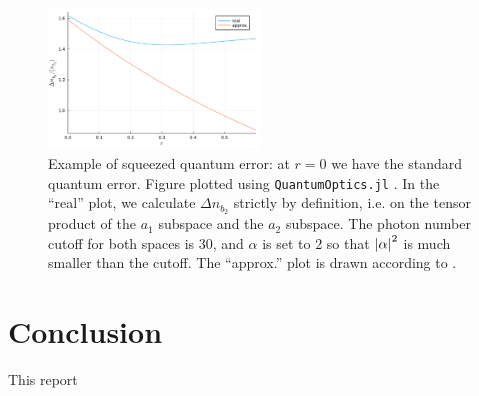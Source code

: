 \documentclass[hyperref, a4paper]{article}
\begin{document}
\begin{figure}
    \centering
    \includegraphics[width=0.5\textwidth]{plots/squeezing-error-measure-cutoff-30-phi-pi-10-alpha-2.pdf}
    \caption{Example of squeezed quantum error: at $r = 0$ we have the standard quantum error.
    Figure plotted using \texttt{QuantumOptics.jl} \cite{kramer2018quantumoptics}.
    In the ``real'' plot, 
    we calculate $\Delta n_{b_2}$ strictly by definition, 
    i.e. on the tensor product of the $a_1$ subspace and the $a_2$ subspace.
    The photon number cutoff for both spaces is 30,
    and $\alpha$ is set to 2 so that $\abs{\alpha}^2$ is much smaller than the cutoff.
    The ``approx.'' plot is drawn according to .
    }
    \label{fig:squeezing}
\end{figure}

\section{Conclusion}

This report 



\end{document}
